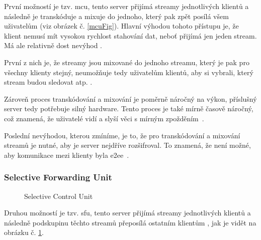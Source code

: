 První možností je tzv. \gls{mcu}, tento server přijímá streamy jednotlivých
klientů a následně je transkóduje a mixuje do jednoho, který pak zpět posílá
všem uživatelům (viz obrázek č. \ref{mcuFig}). Hlavní výhodou tohoto přístupu
je, že klient nemusí mít vysokou rychlost stahování dat, neboť přijímá jen jeden
stream. Má ale relativně dost nevýhod
\parencite{Red5Pro-WebRTCScalingApproaches}.

První z nich je, že streamy jsou mixované do jednoho streamu, který je pak pro
všechny klienty stejný, neumožňuje tedy uživatelům klientů, aby si vybrali,
který stream budou sledovat atp. \parencite{Red5Pro-WebRTCScalingApproaches}.

Zároveň proces transkódování a mixování je poměrně náročný na výkon, příslušný
server tedy potřebuje silný hardware. Tento proces je také mírně časově náročný,
což znamená, že uživatelé vidí a slyší věci s mírným
zpožděním~\parencite{Red5Pro-WebRTCScalingApproaches}.

Poslední nevýhodou, kterou zmíníme, je to, že pro transkódování a mixování
streamů je nutné, aby je server nejdříve rozšifroval. To znamená, že není možné,
aby komunikace mezi klienty byla
\gls{e2ee}~\parencite{ITSecurityKnowHow-E2EGainsANewMeaning}.

\subsubsection{Selective Forwarding Unit}\label{sfu}

\begin{figure}[H]
    \centering
    \caption{Selective Control Unit}
    \label{sfuFig}
\end{figure}

Druhou možností je tzv. \gls{sfu}, tento server přijímá streamy jednotlivých
klientů a následně podskupinu těchto streamů přeposílá ostatním klientům
\parencite{HalOpenScience-SFUs}, jak je vidět na obrázku č. \ref{sfuFig}.

